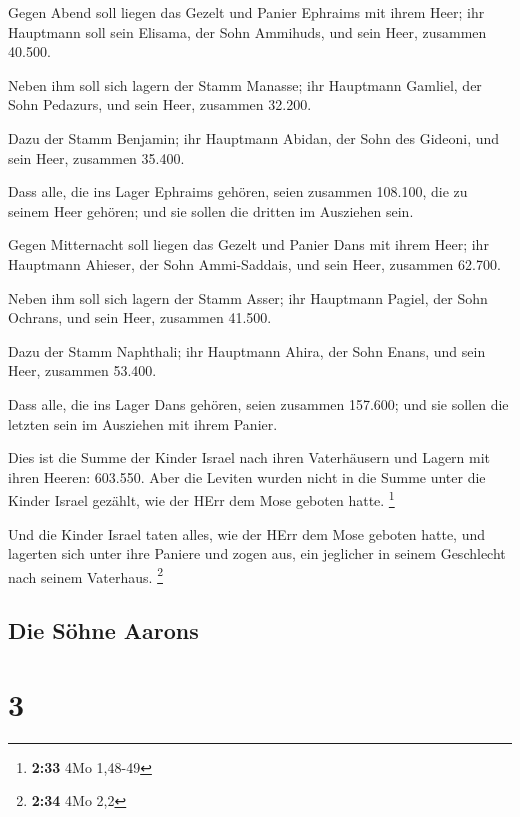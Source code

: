  Gegen Abend soll liegen das Gezelt und Panier Ephraims
mit ihrem Heer; ihr Hauptmann soll sein Elisama, der Sohn Ammihuds,
 und sein Heer, zusammen 40.500.

 Neben ihm soll sich lagern der Stamm Manasse; ihr
Hauptmann Gamliel, der Sohn Pedazurs,  und sein Heer,
zusammen 32.200.

 Dazu der Stamm Benjamin; ihr Hauptmann Abidan, der Sohn
des Gideoni,  und sein Heer, zusammen 35.400.

 Dass alle, die ins Lager Ephraims gehören, seien
zusammen 108.100, die zu seinem Heer gehören; und sie sollen die dritten
im Ausziehen sein.

 Gegen Mitternacht soll liegen das Gezelt und Panier Dans
mit ihrem Heer; ihr Hauptmann Ahieser, der Sohn Ammi-Saddais,
 und sein Heer, zusammen 62.700.

 Neben ihm soll sich lagern der Stamm Asser; ihr
Hauptmann Pagiel, der Sohn Ochrans,  und sein Heer,
zusammen 41.500.

 Dazu der Stamm Naphthali; ihr Hauptmann Ahira, der Sohn
Enans,  und sein Heer, zusammen 53.400.

 Dass alle, die ins Lager Dans gehören, seien zusammen
157.600; und sie sollen die letzten sein im Ausziehen mit ihrem Panier.

 Dies ist die Summe der Kinder Israel nach ihren
Vaterhäusern und Lagern mit ihren Heeren: 603.550.  Aber
die Leviten wurden nicht in die Summe unter die Kinder Israel gezählt,
wie der HErr dem Mose geboten hatte. \footnote{\textbf{2:33} 4Mo 1,48-49}

 Und die Kinder Israel taten alles, wie der HErr dem Mose
geboten hatte, und lagerten sich unter ihre Paniere und zogen aus, ein
jeglicher in seinem Geschlecht nach seinem Vaterhaus. \footnote{\textbf{2:34}
  4Mo 2,2}

\hypertarget{die-suxf6hne-aarons}{%
\subsection{Die Söhne Aarons}\label{die-suxf6hne-aarons}}

\hypertarget{section-2}{%
\section{3}\label{section-2}}

